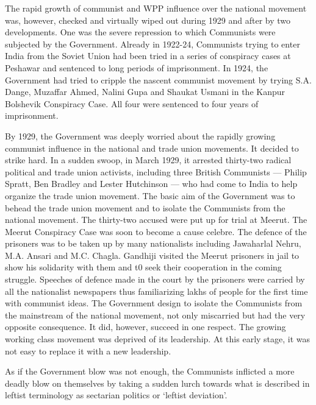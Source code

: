 The rapid growth of communist and WPP influence over the national movement was, however, checked and virtually wiped out during 1929 and after by two developments. One was the severe repression to which Communists were subjected by the Government. Already in 1922-24, Communists trying to enter India from the Soviet Union had been tried in a series of conspiracy cases at Peshawar and sentenced to long periods of imprisonment. In 1924, the Government had tried to cripple the nascent communist movement by trying S.A. Dange, Muzaffar Ahmed, Nalini Gupa and Shaukat Usmani in the Kanpur Bolshevik Conspiracy Case. All four were sentenced to four years of imprisonment. 

By 1929, the Government was deeply worried about the rapidly growing communist influence in the national and trade union movements. It decided to strike hard. In a sudden swoop, in March 1929, it arrested thirty-two radical political and trade union activists, including three British Communists — Philip Spratt, Ben Bradley and Lester Hutchinson — who had come to India to help organize the trade union movement. The basic aim of the Government was to behead the trade union movement and to isolate the Communists from the national movement. The thirty-two accused were put up for trial at Meerut. The Meerut Conspiracy Case was soon to become a cause celebre. The defence of the prisoners was to be taken up by many nationalists including Jawaharlal Nehru, M.A. Ansari and M.C. Chagla. Gandhiji visited the Meerut prisoners in jail to show his solidarity with them and t0 seek their cooperation in the coming struggle. Speeches of defence made in the court by the prisoners were carried by all the nationalist newspapers thus familiarizing lakhs of people for the first time with communist ideas. The Government design to isolate the Communists from the mainstream of the national movement, not only miscarried but had the very opposite consequence. It did, however, succeed in one respect. The growing working class movement was deprived of its leadership. At this early stage, it was not easy to replace it with a new leadership. 

As if the Government blow was not enough, the Communists inflicted a more deadly blow on themselves by taking a sudden lurch towards what is described in leftist terminology as sectarian politics or `leftist deviation'. 


